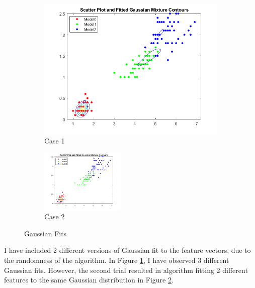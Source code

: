 \documentclass[11pt]{extarticle}
\begin{document}
\begin{figure}[h]%
    \centering
    \begin{subfigure}{4cm}
        \includegraphics[width=\linewidth]{Q2.png}
        \caption{Case 1}\label{fig:random3}
    \end{subfigure}
    \qquad
    \begin{subfigure}{4cm}
        \includegraphics[width=4cm]{Q21.png}
        \caption{Case 2}\label{fig:random2}
    \end{subfigure}
    \caption{Gaussian Fits}%
    \label{fig:q2}%
\end{figure}

I have included 2 different versions of Gaussian fit to the feature vectors, due to the randomness of the algorithm. In Figure \ref{fig:random3}, I have observed 3 different Gaussian fits. However, the second trial resulted in algorithm fitting 2 different features to the same Gaussian distribution in Figure \ref{fig:random2}.
\end{document}
